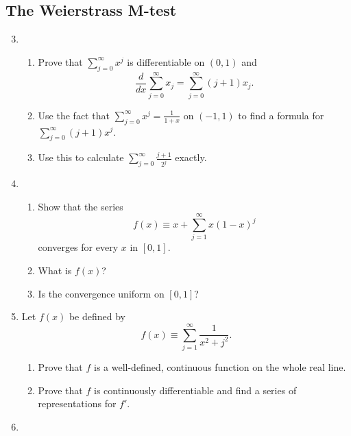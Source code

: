 \documentclass{article}
\begin{document}
\subsection{The Weierstrass M-test}

\begin{enumerate}
      \setcounter{enumi}{2}
      \item \begin{enumerate}
                  \item Prove that $\sum_{j=0}^\infty x^j$ is differentiable
                        on $(0,1)$ and
                        \[
                              \frac{d}{dx}\sum_{j=0}^\infty x_j= \sum_{j=0}^\infty(j+1)x_j.
                        \]
                  \item Use the fact that $\sum_{j=0}^\infty x^j=\frac{1}{1+x}$ on
                        $(-1,1)$ to find a formula for $\sum_{j=0}^\infty(j+1)x^j$.
                  \item Use this to calculate $\sum_{j=0}^\infty\frac{j+1}{2^j}$ exactly.
            \end{enumerate}
            \setcounter{enumi}{4}
      \item \begin{enumerate}
                  \item Show that the series
                        \[
                              f(x)\equiv x+\sum_{j=1}^\infty x(1-x)^j
                        \]
                        converges for every $x$ in $[0,1]$.
                  \item What is $f(x)$?
                  \item Is the convergence uniform on $[0,1]$?
            \end{enumerate}
            \setcounter{enumi}{6}
      \item Let $f(x)$ be defined by
            \[
                  f(x)\equiv \sum_{j=1}^\infty\frac{1}{x^2+j^2}.
            \]
            \begin{enumerate}
                  \item Prove that $f$ is a well-defined, continuous function
                        on the whole real line.
                  \item Prove that $f$ is continuously differentiable and find a
                        series of representations for $f'$.
            \end{enumerate}
            \setcounter{enumi}{10}
      \item \begin{enumerate}

\end{enumerate}
\end{enumerate}
\end{document}
